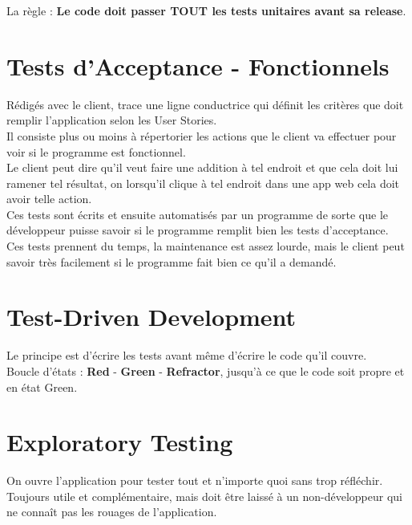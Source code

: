 \documentclass{report}
\begin{document}
		La règle : \textbf{Le code doit passer TOUT les tests unitaires avant sa release}.\\

	\section{Tests d'Acceptance - Fonctionnels}

		Rédigés avec le client, trace une ligne conductrice qui définit les critères que doit remplir l'application selon les User Stories.\\
		Il consiste plus ou moins à répertorier les actions que le client va effectuer pour voir si le programme est fonctionnel.\\

		Le client peut dire qu'il veut faire une addition à tel endroit et que cela doit lui ramener tel résultat, on lorsqu'il clique à tel endroit dans une app web cela doit avoir telle action.\\

		Ces tests sont écrits et ensuite automatisés par un programme de sorte que le développeur puisse savoir si le programme remplit bien les tests d'acceptance.\\

		Ces tests prennent du temps, la maintenance est assez lourde, mais le client peut savoir très facilement si le programme fait bien ce qu'il a demandé.\\

	\section{Test-Driven Development}

		Le principe est d'écrire les tests avant même d'écrire le code qu'il couvre.\\

		Boucle d'états : \textbf{Red} - \textbf{Green} - \textbf{Refractor}, jusqu'à ce que le code soit propre et en état Green.\\

	\section{Exploratory Testing}

		On ouvre l'application pour tester tout et n'importe quoi sans trop réfléchir.\\

		Toujours utile et complémentaire, mais doit être laissé à un non-développeur qui ne connaît pas les rouages de l'application.\\
\end{document}
